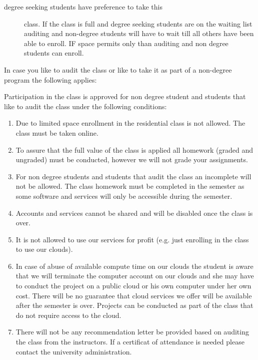 \begin{description}
\item[degree seeking students have preference to take this]
class. If the class is full and degree seeking students are on the
waiting list auditing and non-degree students will have to wait till all
others have been able to enroll. IF space permits only than auditing and
non degree students can enroll.
\end{description}

In case you like to audit the class or like to take it as part of a
non-degree program the following applies:

Participation in the class is approved for non degree student and
students that like to audit the class under the following conditions:

\begin{enumerate}

\item
  Due to limited space enrollment in the residential class is not
  allowed. The class must be taken online.
\item
  To assure that the full value of the class is applied all homework
  (graded and ungraded) must be conducted, however we will not grade
  your assignments.
\item
  For non degree students and students that audit the class an
  incomplete will not be allowed. The class homework must be completed
  in the semester as some software and services will only be accessible
  during the semester.
\item
  Accounts and services cannot be shared and will be disabled once the
  class is over.
\item
  It is not allowed to use our services for profit (e.g. just enrolling
  in the class to use our clouds).
\item
  In case of abuse of available compute time on our clouds the student
  is aware that we will terminate the computer account on our clouds and
  she may have to conduct the project on a public cloud or his own
  computer under her own cost. There will be no guarantee that cloud
  services we offer will be available after the semester is over.
  Projects can be conducted as part of the class that do not require
  access to the cloud.
\item
  There will not be any recommendation letter be provided based on
  auditing the class from the instructors. If a certificat of attendance
  is needed please contact the university administration.
\end{enumerate}

